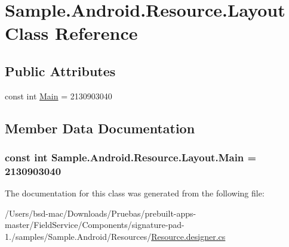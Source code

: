 \hypertarget{class_sample_1_1_android_1_1_resource_1_1_layout}{\section{Sample.\+Android.\+Resource.\+Layout Class Reference}
\label{class_sample_1_1_android_1_1_resource_1_1_layout}
}
\subsection*{Public Attributes}
\begin{DoxyCompactItemize}
\item 
const int \hyperlink{class_sample_1_1_android_1_1_resource_1_1_layout_a06b925b5af27f1787b57055d7ac2889d}{Main} = 2130903040
\end{DoxyCompactItemize}


\subsection{Member Data Documentation}
\hypertarget{class_sample_1_1_android_1_1_resource_1_1_layout_a06b925b5af27f1787b57055d7ac2889d}{
\subsubsection[{Main}]{\setlength{\rightskip}{0pt plus 5cm}const int Sample.\+Android.\+Resource.\+Layout.\+Main = 2130903040}}\label{class_sample_1_1_android_1_1_resource_1_1_layout_a06b925b5af27f1787b57055d7ac2889d}


The documentation for this class was generated from the following file\+:\begin{DoxyCompactItemize}
\item 
/\+Users/bsd-\/mac/\+Downloads/\+Pruebas/prebuilt-\/apps-\/master/\+Field\+Service/\+Components/signature-\/pad-\/1./samples/\+Sample.\+Android/\+Resources/\hyperlink{_components_2signature-pad-1_82_2samples_2_sample_8_android_2_resources_2_resource_8designer_8cs}{Resource.\+designer.\+cs}\end{DoxyCompactItemize}
